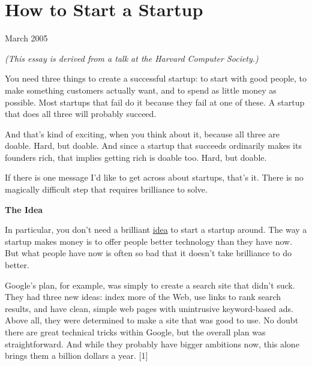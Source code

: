 \chapter{How to Start a Startup}


            
              
                


                  
                    March 2005

\emph{(This essay is derived from a talk at the Harvard
                      Computer Society.)}

You need three things to create a successful
                    startup: to start with good people, to make something
                    customers actually want, and to spend as little money as
                    possible. Most startups that fail do it because they fail at
                    one of these. A startup that does all three will probably
                    succeed.

And that's kind of exciting, when you
                    think about it, because all three are doable. Hard, but
                    doable. And since a startup that succeeds ordinarily makes
                    its founders rich, that implies getting rich is doable too.
                    Hard, but doable.

If there is one message I'd
                    like to get across about startups, that's it. There is no
                    magically difficult step that requires brilliance to
                    solve.

\textbf{The Idea}

In particular,
                    you don't need a brilliant \href{http://www.paulgraham.com/ideas.html}{idea} to
                    start a startup around. The way a startup makes money is to
                    offer people better technology than they have now. But what
                    people have now is often so bad that it doesn't take
                    brilliance to do better.

Google's plan, for
                    example, was simply to create a search site that didn't
                    suck. They had three new ideas: index more of the Web, use
                    links to rank search results, and have clean, simple web
                    pages with unintrusive keyword-based ads. Above all, they
                    were determined to make a site that was good to use. No
                    doubt there are great technical tricks within Google, but
                    the overall plan was straightforward. And while they
                    probably have bigger ambitions now, this alone brings them a
                    billion dollars a year. [1]

